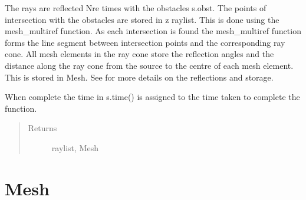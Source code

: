 \documentclass[letterpaper,10pt,english]{sphinxmanual}
\begin{document}
\begin{fulllineitems}
\begin{fulllineitems}
The rays are reflected Nre times with the obstacles s.obst.     The points of intersection with the obstacles are stored in z
raylist. This is done using the mesh\_multiref function.
As each intersection is found the mesh\_multiref function     forms the line segment between intersection points and the     corresponding ray cone. All mesh elements in the ray cone store     the reflection angles and the distance along the ray cone from the     source to the centre of each mesh element. This is stored in Mesh.
See  for more details on the     reflections and storage.

When complete the time in s.time() is assigned to the time taken     to complete the function.
\begin{quote}\begin{description}
\item[{Returns}] \leavevmode
raylist, Mesh

\end{description}\end{quote}

\end{fulllineitems}


\end{fulllineitems}



\chapter{Mesh}
\label{index:module-DictionarySparseMatrix}\label{index:mesh}
\end{document}
